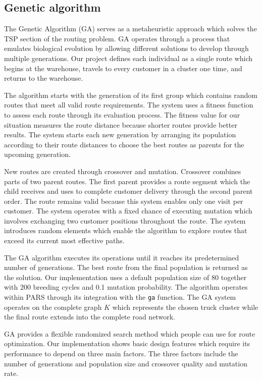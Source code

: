 \documentclass[conference]{IEEEtran}
\begin{document}
\subsection{Genetic algorithm}

The Genetic Algorithm (GA) serves as a metaheuristic approach which solves the TSP section of the routing problem. GA operates through a process that emulates biological evolution by allowing different solutions to develop through multiple generations. Our project defines each individual as a single route which begins at the warehouse, travels to every customer in a cluster one time, and returns to the warehouse.

The algorithm starts with the generation of its first group which contains random routes that meet all valid route requirements. The system uses a fitness function to assess each route through its evaluation process. The fitness value for our situation measures the route distance because shorter routes provide better results. The system starts each new generation by arranging its population according to their route distances to choose the best routes as parents for the upcoming generation.

New routes are created through crossover and mutation. Crossover combines parts of two parent routes. The first parent provides a route segment which the child receives and uses to complete customer delivery through the second parent order. The route remains valid because this system enables only one visit per customer. The system operates with a fixed chance of executing mutation which involves exchanging two customer positions throughout the route. The system introduces random elements which enable the algorithm to explore routes that exceed its current most effective paths.

The GA algorithm executes its operations until it reaches its predetermined number of generations. The best route from the final population is returned as the solution. Our implementation uses a default population size of 80 together with 200 breeding cycles and 0.1 mutation probability. The algorithm operates within PARS through its integration with the \texttt{ga} function. The GA system operates on the complete graph $K$ which represents the chosen truck cluster while the final route extends into the complete road network.

GA provides a flexible randomized search method which people can use for route optimization. Our implementation shows basic design features which require its performance to depend on three main factors. The three factors include the number of generations and population size and crossover quality and mutation rate.
\end{document}

